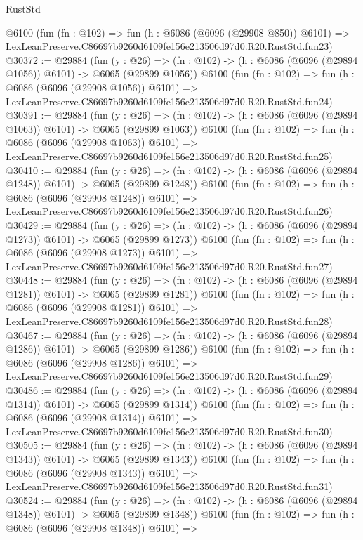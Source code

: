\begin{lexlean}{RustStd}
\begin{coremodule}
    @6100
    (fun (fn : @102) =>
    fun (h : @6086 (@6096 (@29908 @850)) @6101) =>
    LexLeanPreserve.C86697b9260d6109fe156e213506d97d0.R20.RustStd.fun23)
@30372 := @29884
    (fun (y : @26) =>
    (fn : @102) -> (h : @6086 (@6096 (@29894 @1056)) @6101) -> @6065 (@29899 @1056))
    @6100
    (fun (fn : @102) =>
    fun (h : @6086 (@6096 (@29908 @1056)) @6101) =>
    LexLeanPreserve.C86697b9260d6109fe156e213506d97d0.R20.RustStd.fun24)
@30391 := @29884
    (fun (y : @26) =>
    (fn : @102) -> (h : @6086 (@6096 (@29894 @1063)) @6101) -> @6065 (@29899 @1063))
    @6100
    (fun (fn : @102) =>
    fun (h : @6086 (@6096 (@29908 @1063)) @6101) =>
    LexLeanPreserve.C86697b9260d6109fe156e213506d97d0.R20.RustStd.fun25)
@30410 := @29884
    (fun (y : @26) =>
    (fn : @102) -> (h : @6086 (@6096 (@29894 @1248)) @6101) -> @6065 (@29899 @1248))
    @6100
    (fun (fn : @102) =>
    fun (h : @6086 (@6096 (@29908 @1248)) @6101) =>
    LexLeanPreserve.C86697b9260d6109fe156e213506d97d0.R20.RustStd.fun26)
@30429 := @29884
    (fun (y : @26) =>
    (fn : @102) -> (h : @6086 (@6096 (@29894 @1273)) @6101) -> @6065 (@29899 @1273))
    @6100
    (fun (fn : @102) =>
    fun (h : @6086 (@6096 (@29908 @1273)) @6101) =>
    LexLeanPreserve.C86697b9260d6109fe156e213506d97d0.R20.RustStd.fun27)
@30448 := @29884
    (fun (y : @26) =>
    (fn : @102) -> (h : @6086 (@6096 (@29894 @1281)) @6101) -> @6065 (@29899 @1281))
    @6100
    (fun (fn : @102) =>
    fun (h : @6086 (@6096 (@29908 @1281)) @6101) =>
    LexLeanPreserve.C86697b9260d6109fe156e213506d97d0.R20.RustStd.fun28)
@30467 := @29884
    (fun (y : @26) =>
    (fn : @102) -> (h : @6086 (@6096 (@29894 @1286)) @6101) -> @6065 (@29899 @1286))
    @6100
    (fun (fn : @102) =>
    fun (h : @6086 (@6096 (@29908 @1286)) @6101) =>
    LexLeanPreserve.C86697b9260d6109fe156e213506d97d0.R20.RustStd.fun29)
@30486 := @29884
    (fun (y : @26) =>
    (fn : @102) -> (h : @6086 (@6096 (@29894 @1314)) @6101) -> @6065 (@29899 @1314))
    @6100
    (fun (fn : @102) =>
    fun (h : @6086 (@6096 (@29908 @1314)) @6101) =>
    LexLeanPreserve.C86697b9260d6109fe156e213506d97d0.R20.RustStd.fun30)
@30505 := @29884
    (fun (y : @26) =>
    (fn : @102) -> (h : @6086 (@6096 (@29894 @1343)) @6101) -> @6065 (@29899 @1343))
    @6100
    (fun (fn : @102) =>
    fun (h : @6086 (@6096 (@29908 @1343)) @6101) =>
    LexLeanPreserve.C86697b9260d6109fe156e213506d97d0.R20.RustStd.fun31)
@30524 := @29884
    (fun (y : @26) =>
    (fn : @102) -> (h : @6086 (@6096 (@29894 @1348)) @6101) -> @6065 (@29899 @1348))
    @6100
    (fun (fn : @102) =>
    fun (h : @6086 (@6096 (@29908 @1348)) @6101) =>

\end{coremodule}
\end{lexlean}
